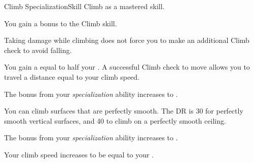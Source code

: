     \begin{feat}{Climb Specialization}{Skill}
        \featpre Climb as a mastered skill.

         You gain a  bonus to the Climb skill.

         Taking damage while climbing does not force you to make an additional Climb check to avoid falling.

         You gain a  equal to half your .
        A successful Climb check to move allows you to travel a distance equal to your climb speed.

         The bonus from your \textit{specialization} ability increases to .

         You can climb surfaces that are perfectly smooth.
        The DR is 30 for perfectly smooth vertical surfaces, and 40 to climb on a perfectly smooth ceiling.

         The bonus from your \textit{specialization} ability increases to .

         Your climb speed increases to be equal to your .
    \end{feat}

